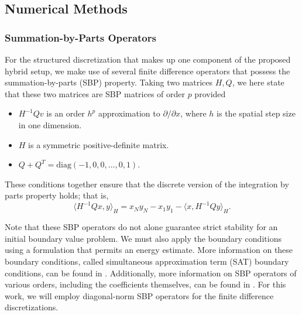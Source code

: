 \subsection{Numerical Methods}

\subsubsection{Summation-by-Parts Operators}

For the structured discretization that makes up one component of the proposed hybrid setup, we make use of several
finite difference operators that possess the summation-by-parts (SBP) property. Taking two matrices
${H,Q}$, we here state that these two matrices are SBP matrices of order $p$ provided 
\begin{itemize}
\item $H^{-1}Q v$ is an order $h^{p}$ approximation to $\partial/\partial x$, where $h$ is the spatial step size in one dimension.
\item $H$ is a symmetric positive-definite matrix.
\item $Q + Q^{T} = \text{diag}(-1,0,0,...,0,1)$.
\end{itemize}
These conditions together ensure that the discrete version of the integration by parts property holds; that is,
\[\langle H^{-1}Q x , y\rangle_{H} = x_{N} y_{N} -  x_{1} y_{1} - \langle x,H^{-1}Q y\rangle _{H}. \]

Note that these SBP operators do not alone guarantee strict
stability for an initial boundary value problem. We must also apply the boundary conditions using a
formulation that permits an energy estimate. More information on these boundary conditions, called
simultaneous approximation term (SAT) boundary conditions, can be found in \cite{svard2007stable,
svard2008stable, bodony2010accuracy}. Additionally, more information on SBP operators
of various orders, including the coefficients themselves, can be found
in \cite{strand1994summation, carpenter1993time, mattsson2004stable}. For this work,
we will employ diagonal-norm SBP operators for the finite difference discretizations.

